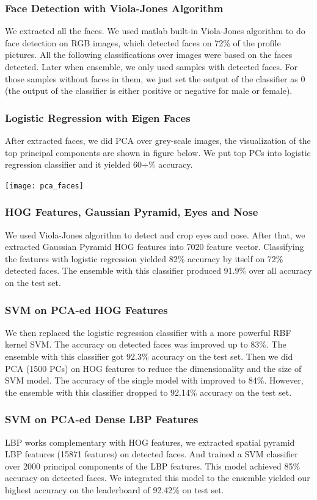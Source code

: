 \subsubsection{Face Detection with Viola-Jones Algorithm}
We extracted all the faces. We used matlab built-in Viola-Jones algorithm to do face detection on RGB images, which detected faces on 72\% of the profile pictures. All the following classifications over images were based on the faces detected. Later when ensemble, we only used samples with detected faces. For those samples without faces in them, we just set the output of the classifier as 0 (the output of the classifier is either positive or negative for male or female).
\subsubsection{Logistic Regression with Eigen Faces}
After extracted faces, we did PCA over grey-scale images, the visualization of the top principal components are shown in figure below. We put top PCs into logistic regression classifier and it yielded 60+\% accuracy. \\
\begin{center}
\texttt{[image: pca\_faces]}
\end{center}
\subsubsection{HOG Features, Gaussian Pyramid, Eyes and Nose}
We used Viola-Jones algorithm to detect and crop eyes and nose. After that, we extracted Gaussian Pyramid HOG features into 7020 feature vector. Classifying the features with logistic regression yielded 82\% accuracy by itself on 72\% detected faces. The ensemble with this classifier produced 91.9\% over all accuracy on the test set. 
\subsubsection{SVM on PCA-ed HOG Features}
We then replaced the logistic regression classifier with a more powerful RBF kernel SVM. The accuracy on detected faces was improved up to 83\%. The ensemble with this classifier got 92.3\% accuracy on the test set.  Then we did PCA (1500 PCs) on HOG features to reduce the dimensionality and the size of SVM model. The accuracy of the single model with improved to 84\%. However, the ensemble with this classifier dropped to 92.14\% accuracy on the test set. 
\subsubsection{SVM on PCA-ed Dense LBP Features}
LBP works complementary with HOG features, we extracted spatial pyramid LBP features (15871 features) on detected faces. And trained a SVM classifier over 2000 principal components of the LBP features. This model achieved 85\% accuracy on detected faces. We integrated this model to the ensemble yielded our highest accuracy on the leaderboard of 92.42\% on test set.
